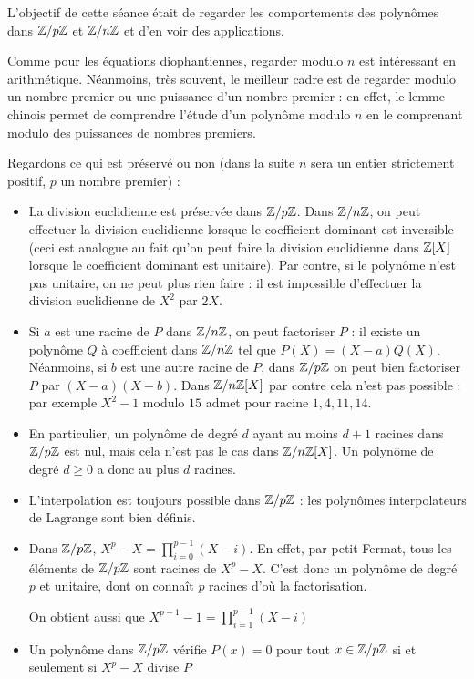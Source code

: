 L'objectif de cette séance était de regarder les comportements des polynômes dans $\mathbb Z/p\mathbb Z$ et $\mathbb Z/ n\mathbb Z$ et d'en voir des applications.

Comme pour les équations diophantiennes, regarder modulo $n$ est intéressant en arithmétique. Néanmoins, très souvent, le meilleur cadre est de regarder modulo un nombre premier ou une puissance d'un nombre premier : en effet, le lemme chinois permet de comprendre l'étude d'un polynôme modulo $n$ en le comprenant modulo des puissances de nombres premiers.\smallskip

Regardons ce qui est préservé ou non (dans la suite $n$ sera un entier strictement positif, $p$ un nombre premier) :
\begin{itemize}
\item La division euclidienne est préservée dans $\mathbb Z/p\mathbb Z$. Dans $\mathbb Z/n\mathbb Z$, on peut effectuer la division euclidienne lorsque le coefficient dominant est inversible (ceci est analogue au fait qu'on peut faire la division euclidienne dans $\mathbb Z[X]$ lorsque le coefficient dominant est unitaire). Par contre, si le polynôme n'est pas unitaire, on ne peut plus rien faire : il est impossible d'effectuer la division euclidienne de $X^2$ par $2X$.
\item Si $a$ est une racine de $P$ dans $\mathbb Z/n\mathbb Z$, on peut factoriser $P$ : il existe un polynôme $Q$ à coefficient dans $\mathbb Z/n\mathbb Z$ tel que $P(X)=(X - a)Q(X)$. Néanmoins, si $b$ est une autre racine de $P$, dans $\mathbb Z/p\mathbb Z$ on peut bien factoriser $P$ par $(X - a)(X - b)$. Dans $\mathbb Z/n\mathbb Z[X]$ par contre cela n'est pas possible : par exemple $X^2 - 1$ modulo $15$ admet pour racine $1,4,11, 14$.
\item En particulier, un polynôme de degré $d$ ayant au moins $d + 1$ racines dans $\mathbb Z/p\mathbb Z$ est nul, mais cela n'est pas le cas dans $\mathbb Z/n\mathbb Z[X]$. Un polynôme de degré $d\geq 0$ a donc au plus $d$ racines.
\item L'interpolation est toujours possible dans $\mathbb Z/p\mathbb Z$ : les polynômes interpolateurs de Lagrange sont bien définis.
\item Dans $\mathbb Z/p\mathbb Z$, $X^p - X=\prod\limits_{i=0}^{p - 1}(X - i)$. En effet, par petit Fermat, tous les éléments de $\mathbb Z/p\mathbb Z$ sont racines de $X^p - X$. C'est donc un polynôme de degré $p$ et unitaire, dont on connaît $p$ racines d'où la factorisation.

On obtient aussi que $X^{p - 1} - 1=\prod\limits_{i=1}^{p - 1}(X - i)$

\item Un polynôme dans $\mathbb Z/p\mathbb Z$ vérifie $P(x)=0$ pour tout $x\in \mathbb Z/p\mathbb Z$ si et seulement si $X^p - X$ divise $P$


\end{itemize}
